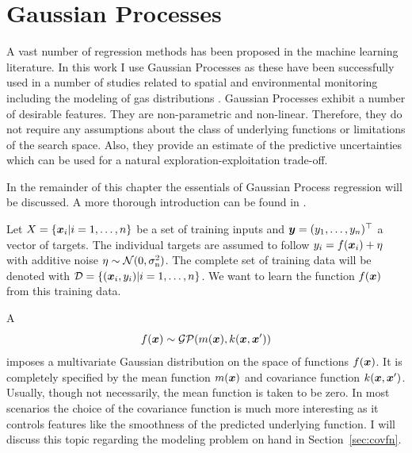 \chapter{Gaussian Processes}\label{sec:gp}
A vast number of regression methods has been proposed in the machine learning 
literature. In this work I use Gaussian Processes as these have been 
successfully used in a number of studies related to spatial and environmental 
monitoring including the modeling of gas distributions 
\parencite[e.\,g.][]{Stranders:2008wl, Marchant:2012wb, Stachniss:2008vz}.  
Gaussian Processes exhibit a number of desirable features. They are 
non-parametric and non-linear. Therefore, they do not require any assumptions 
about the class of underlying functions or limitations of the search space.  
Also, they provide an estimate of the predictive uncertainties which can be used 
for a natural exploration-exploitation trade-off.

In the remainder of this chapter the essentials of Gaussian Process regression 
will be discussed.  A more thorough introduction can be found in 
\textcite{Rasmussen:2006vz}.

Let $X = \{\bm{x}_i | i = 1, \dots, n\}$ be a set of training inputs and $\bm{y} = (y_1, \dots, y_n)^{\top}$ a vector of targets. The individual targets are 
assumed to follow $y_i = f(\bm{x}_i) + \eta$ with additive noise $\eta \sim 
\mathcal{N}(0, \sigma_{\mathrm{n}}^2)$. The complete set of training data will be 
denoted with $\mathcal{D} = \{(\bm{x}_i, y_i) | i = 1, \dots, n\}$. We want to 
learn the function $f(\bm{x})$ from this training data.

A 
\begin{equation}
    f(\bm{x}) \sim \mathcal{GP}(m(\bm{x}), k(\bm{x}, \bm{x}'))
\end{equation}
imposes a multivariate Gaussian distribution on the space of functions $f(\bm{x})$. It is completely specified by the mean function $m(\bm{x})$ and covariance 
function $k(\bm{x}, \bm{x}')$. Usually, though not necessarily, the mean function 
is taken to be zero. In most scenarios the choice of the covariance function is 
much more interesting as it controls features like the smoothness of the 
predicted underlying function. I will discuss this topic regarding the modeling 
problem on hand in Section~\ref{sec:covfn}.

